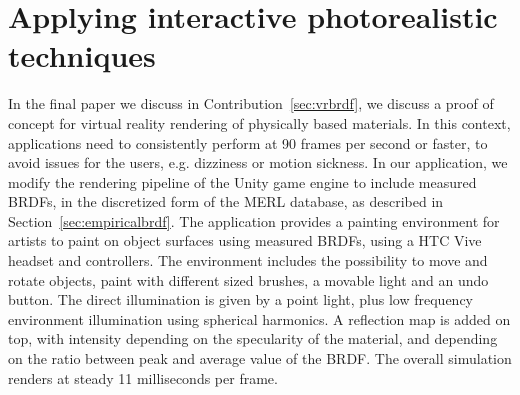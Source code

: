 \section{Applying interactive photorealistic techniques}
\label{sec:vrbrfcontribution}

In the final paper we discuss in Contribution~\ref{sec:vrbrdf}, we discuss a proof of concept for virtual reality rendering of physically based materials. In this context, applications need to consistently perform at 90 frames per second or faster, to avoid issues for the users, e.g. dizziness or motion sickness. In our application, we modify the rendering pipeline of the Unity game engine to include measured BRDFs, in the discretized form of the MERL database, as described in Section~\ref{sec:empiricalbrdf}. The application provides a painting environment for artists to paint on object surfaces using measured BRDFs, using a HTC Vive headset and controllers. The environment includes the possibility to move and rotate objects, paint with different sized brushes, a movable light and an undo button. The direct illumination is given by a point light, plus low frequency environment illumination using spherical harmonics. A reflection map is added on top, with intensity depending on the specularity of the material, and depending on the ratio between peak and average value of the BRDF. The overall simulation renders at steady 11 milliseconds per frame.


